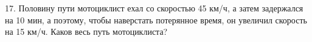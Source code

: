 17. Половину пути мотоциклист ехал со скоростью 45 км/ч, а затем задержался на 10 мин, а поэтому, чтобы наверстать потерянное время, он увеличил скорость на 15 км/ч. Каков весь путь мотоциклиста?\\
